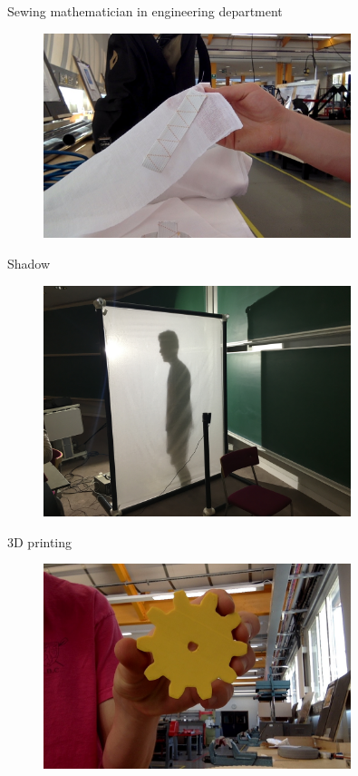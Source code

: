 \documentclass{beamer}
\begin{document}
\begin{frame}{Sewing mathematician in engineering department}
    \begin{figure}[H]
      \centering
        \includegraphics[width=0.8\textwidth]{sewing.jpg}
      \label{fig:f2}
    \end{figure}
\end{frame}

\begin{frame}{Shadow}
    \begin{figure}[H]
      \centering
        \includegraphics[width=0.8\textwidth]{IMG_5452.jpg}
      \label{fig:f2}
    \end{figure}
\end{frame}

\begin{frame}{3D printing}
    \begin{figure}[H]
      \centering
        \includegraphics[width=0.8\textwidth]{printed_cog.jpg}
      \label{fig:f2}
    \end{figure}
\end{frame}
\end{document}
